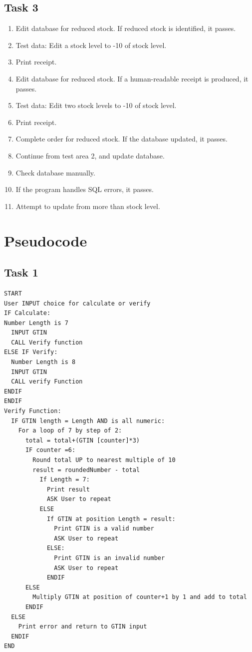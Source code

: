 \documentclass[a4paper]{article}
\begin{document}
\subsection{Task 3}
\begin{enumerate}
\item{Edit database for reduced stock. If reduced stock is identified, it passes.}
\item[~]{Test data: Edit a stock level to -10 of stock level.}
\item[~]{Print receipt.}
\item{Edit database for reduced stock. If a human-readable receipt is produced, it passes.}
\item[~]{Test data: Edit two stock levels to -10 of stock level.}
\item[~]{Print receipt.}
\item{Complete order for reduced stock. If the database updated, it passes.}
\item[~]{Continue from test area 2, and update database.}
\item[~]{Check database manually.}
\item{If the program handles SQL errors, it passes.}
\item[~]{Attempt to update from more than stock level.}
\end{enumerate}


\pagebreak

\section{Pseudocode}
\subsection{Task 1}
\begin{lstlisting}
START
User INPUT choice for calculate or verify	
IF Calculate:
Number Length is 7
  INPUT GTIN
  CALL Verify function
ELSE IF Verify:
  Number Length is 8
  INPUT GTIN
  CALL verify Function
ENDIF
ENDIF
Verify Function:
  IF GTIN length = Length AND is all numeric:
    For a loop of 7 by step of 2:
      total = total+(GTIN [counter]*3)
      IF counter =6:
        Round total UP to nearest multiple of 10
        result = roundedNumber - total
          If Length = 7:
            Print result
            ASK User to repeat
          ELSE
            If GTIN at position Length = result:
              Print GTIN is a valid number
              ASK User to repeat
            ELSE:
              Print GTIN is an invalid number
              ASK User to repeat
            ENDIF
      ELSE
        Multiply GTIN at position of counter+1 by 1 and add to total
      ENDIF
  ELSE
    Print error and return to GTIN input
  ENDIF
END
\end{lstlisting}
\pagebreak
\end{document}
